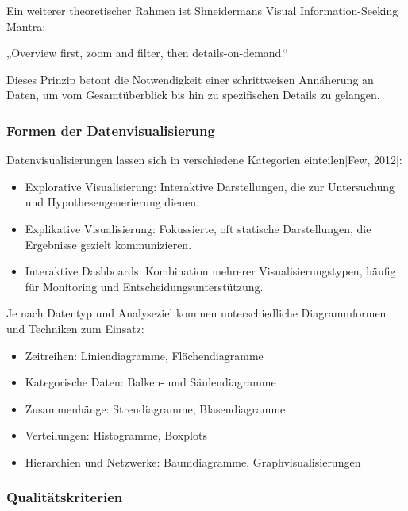Ein weiterer theoretischer Rahmen ist Shneidermans Visual Information-Seeking Mantra:



„Overview first, zoom and filter, then details-on-demand.“

Dieses Prinzip betont die Notwendigkeit einer schrittweisen Annäherung an Daten, um vom Gesamtüberblick bis hin zu
spezifischen Details zu gelangen.


\subsubsection{Formen der Datenvisualisierung}

Datenvisualisierungen lassen sich in verschiedene Kategorien einteilen[Few, 2012]:

\begin{itemize}

\item
Explorative Visualisierung: Interaktive Darstellungen, die zur Untersuchung und Hypothesengenerierung dienen.
\item
Explikative Visualisierung: Fokussierte, oft statische Darstellungen, die Ergebnisse gezielt kommunizieren.
\item
Interaktive Dashboards: Kombination mehrerer Visualisierungstypen, häufig für Monitoring und Entscheidungsunterstützung.

\end{itemize}

Je nach Datentyp und Analyseziel kommen unterschiedliche Diagrammformen und Techniken zum Einsatz:

\begin{itemize}

\item
Zeitreihen: Liniendiagramme, Flächendiagramme
\item
Kategorische Daten: Balken- und Säulendiagramme
\item
Zusammenhänge: Streudiagramme, Blasendiagramme
\item
Verteilungen: Histogramme, Boxplots
\item
Hierarchien und Netzwerke: Baumdiagramme, Graphvisualisierungen

\end{itemize}

\subsubsection{Qualitätskriterien}

